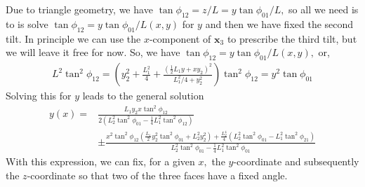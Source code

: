 \documentclass[10pt,a4paper]{article}
\newcommand{\half}[0]{\frac{1}{2}}
\newcommand{\bvec}[1]{\mathbf{#1}}
\begin{document}
Due to triangle geometry, we have $\tan \phi_{12} = z / L = y \tan \phi_{01} / L,$ so all we need is to is solve $\tan \phi_{12} = y \tan \phi_{01} / L(x,y)$ for $y$ and then we have fixed the second tilt.
In principle we can use the $x$-component of $\bvec{x}_3$ to prescribe the third tilt, but we will leave it free for now.
So, we have $\tan \phi_{12} = y \tan \phi_{01} / L(x,y),$ or,
\begin{align*}
  L^2 \tan^2\phi_{12} = \left( y_2^2 + \frac{L_1^2}{4} + \frac{(\half L_1 y + x y_2)^2}{L_1^2/4 + y_2^2} \right)\tan^2\phi_{12} = y^2 \tan \phi_{01}
\end{align*}
Solving this for $y$ leads to the general solution
\begin{align*}
  y(x) =& \frac{L_1 y_2 x \tan^2 \phi_{12}}{2(L_2^2 \tan^2 \phi_{01} - \frac{1}{4}L_1^2 \tan^2\phi_{12})} \\
  &\pm \frac{x^2 \tan^2\phi_{12}\left( \frac{L_1}{2}y^2_2\tan^2\phi_{01} + L_2^2y_2^2\right) + \frac{L_2^4}{4}\left( L_2^2 \tan^2\phi_{01} - L_1^2\tan^2\phi_{21} \right)}{L_2^2 \tan^2 \phi_{01} - \frac{1}{4}L_1^2 \tan^2\phi_{01}}
\end{align*}
With this expression, we can fix, for a given $x,$ the $y$-coordinate and subsequently the $z$-coordinate so that two of the three faces have a fixed angle.
\end{document}
